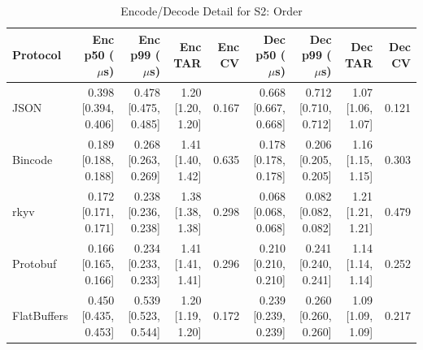 \begin{table}[htbp]
\centering
\caption{Encode/Decode Detail for S2: Order}
\label{tab:detail_order}
\begin{tabular}{l r r r r r r r r}
\hline
Protocol & Enc p50 ($\mu$s) & Enc p99 ($\mu$s) & Enc TAR & Enc CV & Dec p50 ($\mu$s) & Dec p99 ($\mu$s) & Dec TAR & Dec CV \\
\hline
  JSON & 0.398 [0.394, 0.406] & 0.478 [0.475, 0.485] & 1.20 [1.20, 1.20] & 0.167 & 0.668 [0.667, 0.668] & 0.712 [0.710, 0.712] & 1.07 [1.06, 1.07] & 0.121 \\
  Bincode & 0.189 [0.188, 0.188] & 0.268 [0.263, 0.269] & 1.41 [1.40, 1.42] & 0.635 & 0.178 [0.178, 0.178] & 0.206 [0.205, 0.205] & 1.16 [1.15, 1.15] & 0.303 \\
  rkyv & 0.172 [0.171, 0.171] & 0.238 [0.236, 0.238] & 1.38 [1.38, 1.38] & 0.298 & 0.068 [0.068, 0.068] & 0.082 [0.082, 0.082] & 1.21 [1.21, 1.21] & 0.479 \\
  Protobuf & 0.166 [0.165, 0.166] & 0.234 [0.233, 0.233] & 1.41 [1.41, 1.41] & 0.296 & 0.210 [0.210, 0.210] & 0.241 [0.240, 0.241] & 1.14 [1.14, 1.14] & 0.252 \\
  FlatBuffers & 0.450 [0.435, 0.453] & 0.539 [0.523, 0.544] & 1.20 [1.19, 1.20] & 0.172 & 0.239 [0.239, 0.239] & 0.260 [0.260, 0.260] & 1.09 [1.09, 1.09] & 0.217 \\
\hline
\end{tabular}
\end{table}